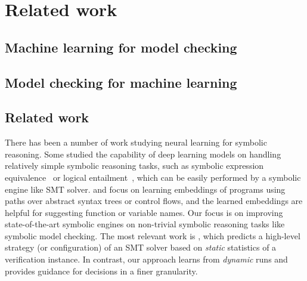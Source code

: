 \chapter{Related work}
\section{Machine learning for model checking}
\section{Model checking for machine learning}
\section{Related work}
There has been a number of work studying neural learning for symbolic reasoning. 
Some studied the capability of deep learning models on handling relatively simple symbolic reasoning tasks, such as symbolic expression equivalence~\cite{Allamanis:icml17} or logical entailment~\cite{Evans:iclr18}, which can be easily performed by a symbolic engine like SMT solver. 
\cite{code2vec} and \cite{ir2vec} focus on learning embeddings of programs using paths over abstract syntax trees or control flows, and the learned embeddings are helpful for suggesting function or variable names. 
Our focus is on improving state-of-the-art symbolic engines on non-trivial symbolic reasoning tasks like symbolic model checking. The most relevant work is \cite{Balunovic:nips18}, which predicts a high-level strategy (or configuration) of an SMT solver based on \textit{static} statistics of a verification instance. 
In contrast, our approach learns from \textit{dynamic} runs and provides guidance for decisions in a finer granularity. 
